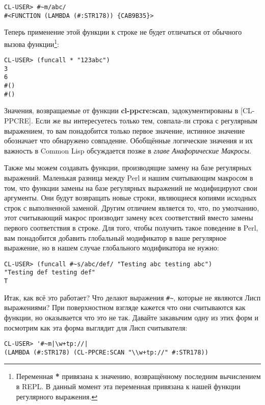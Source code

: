 \begin{verbatim}
CL-USER> #~m/abc/
#<FUNCTION (LAMBDA (#:STR178)) {CAB9B35}>
\end{verbatim}

Теперь применение этой функции к строке не будет отличаться от обычного вызова функции\footnote{Переменная \textbf{*} привязана к значению, возвращённому последним вычислением в REPL. В данный момент эта переменная привязана к нашей функции регулярного выражения.}:

\begin{verbatim}
CL-USER> (funcall * "123abc")
3
6
#()
#()
\end{verbatim}

Значения, возвращаемые от функции \textbf{cl-ppcre:scan}, задокументированы в [CL-PPCRE]. Если же вы интересуетесь только тем, совпала-ли строка с регулярным выражением, то вам понадобится только первое значение, истинное значение обозначает что обнаружено совпадение. Обобщённые логические значения и их важность в Common Lisp обсуждается позже в \emph{главе Анафорические Макросы}.

Также мы можем создавать функции, производящие замену на базе регулярных выражений. Маленькая разница между Perl и нашим считывающим макросом в том, что функции замены на базе регулярных выражений не модифицируют свои аргументы. Они будут возвращать новые строки, являющиеся копиями исходных строк с выполненной заменой. Другим отличием является то, что, по умолчанию, этот считывающий макрос производит замену всех соответствий вместо замены первого соответствия в строке. Для того, чтобы получить такое поведение в Perl, вам понадобится добавить глобальный модификатор в ваше регулярное выражение, но в нашем случае глобального модификатора не нужно:

\begin{verbatim}
CL-USER> (funcall #~s/abc/def/ "Testing abc testing abc")
"Testing def testing def"
T
\end{verbatim}

Итак, как всё это работает? Что делают выражения \verb"#~", которые не являются Лисп выражениями? При поверхностном взгляде кажется что они считываются как функции, но оказывается что это не так. Давайте закавычим одну из этих форм и посмотрим как эта форма выглядит для Лисп считывателя:

\begin{verbatim}
CL-USER> '#~m|\w+tp://|
(LAMBDA (#:STR178) (CL-PPCRE:SCAN "\\w+tp://" #:STR178))
\end{verbatim}

